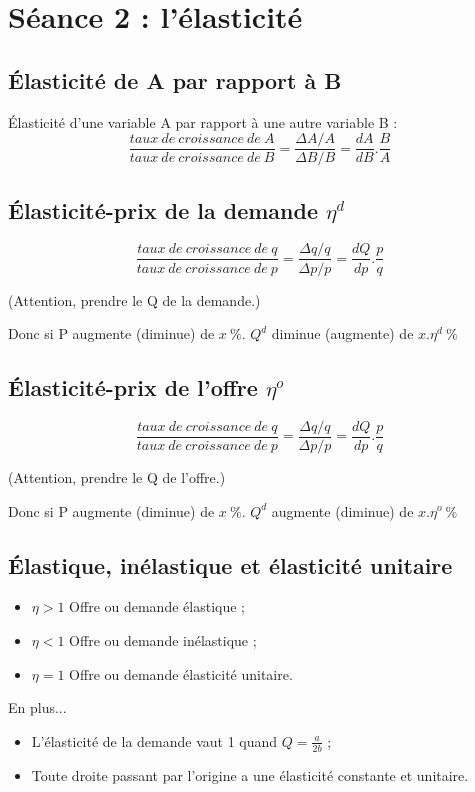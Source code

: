 \section{Séance 2 : l'élasticité}



\subsection{Élasticité de A par rapport à B}
Élasticité d'une variable A par rapport à une autre variable B :
$$\frac{taux\ de\ croissance\ de\ A}{taux\ de\ croissance\ de\ B}=\frac{\Delta A/A}{\Delta B/B}=\frac{dA}{dB}.\frac{B}{A}$$



\subsection{Élasticité-prix de la demande $\eta^d$}
$$\frac{taux\ de\ croissance\ de\ q}{taux\ de\ croissance\ de\ p}=\frac{\Delta q/q}{\Delta p/p}=\frac{dQ}{dp}.\frac{p}{q}$$ 
\begin{flushright}
	(Attention, prendre le Q de la demande.)
\end{flushright}
Donc si P augmente (diminue) de $x\ \%$. $Q^d$ diminue (augmente) de $x.\eta^d\ \%$



\subsection{Élasticité-prix de l'offre $\eta^o$}
$$\frac{taux\ de\ croissance\ de\ q}{taux\ de\ croissance\ de\ p}=\frac{\Delta q/q}{\Delta p/p}=\frac{dQ}{dp}.\frac{p}{q}$$ 
\begin{flushright}
	(Attention, prendre le Q de l'offre.)
\end{flushright}
Donc si P augmente (diminue) de $x\ \%$. $Q^d$ augmente (diminue) de $x.\eta^o\ \%$



\subsection{Élastique, inélastique et élasticité unitaire}
\begin{itemize} 
    \item $\eta > 1$ Offre ou demande élastique ;
    \item $\eta < 1$ Offre ou demande inélastique ;
    \item $\eta = 1$ Offre ou demande élasticité unitaire.
\end{itemize}
En plus...
\begin{itemize}
    \item L’élasticité de la demande vaut 1 quand $Q=\frac{a}{2b}$ ;
    \item Toute droite passant par l’origine a une élasticité constante et unitaire.
\end{itemize}


